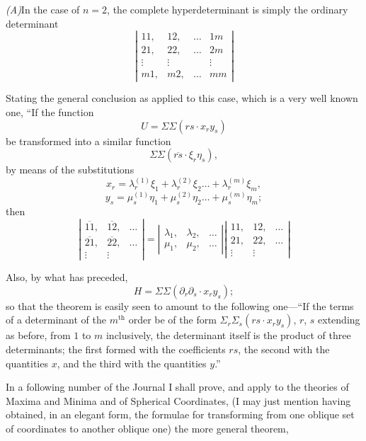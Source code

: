 \documentclass[11pt,a4paper]{book}
\begin{document}
\textit{(A)}\quad In the case of $n=2$, the complete hyperdeterminant is simply the ordinary
determinant
\[
\left|\begin{array}{cccc}
11, & 12, & \ldots & 1m \\
21, & 22, & \ldots & 2m \\
\vdots & \vdots & & \vdots \\
m1, & m2, & \ldots & mm
\end{array}\right|
\]

Stating the general conclusion as applied to this case, which is a very well known one,
``If the function
\[
U = \Sigma\Sigma(rs \cdot x_r y_s)
\]
be transformed into a similar function
\[
\Sigma\Sigma(\overline{rs} \cdot \xi_r \eta_s),
\]
by means of the substitutions
\[
x_r = \lambda_r^{(1)} \xi_1 + \lambda_r^{(2)} \xi_2 \ldots + \lambda_r^{(m)} \xi_m,
\]
\[
y_s = \mu_s^{(1)} \eta_1 + \mu_s^{(2)} \eta_2 \ldots + \mu_s^{(m)} \eta_m;
\]
then
\[
\left|\begin{array}{cccc}
\overline{11}, & \overline{12}, & \ldots \\
\overline{21}, & \overline{22}, & \ldots \\
\vdots & \vdots
\end{array}\right|
=
\left|\begin{array}{cccc}
\lambda_1, & \lambda_2, & \ldots \\
\mu_1, & \mu_2, & \ldots
\end{array}\right|
\left|\begin{array}{cccc}
11, & 12, & \ldots \\
21, & 22, & \ldots \\
\vdots & \vdots
\end{array}\right|
\]

Also, by what has preceded,
\[
H = \Sigma\Sigma(\partial_r \partial_s \cdot x_r y_s);
\]
so that the theorem is easily seen to amount to the following one---``If the terms of
a determinant of the $m^{\text{th}}$ order be of the form $\Sigma_r \Sigma_s (rs \cdot x_r y_s)$, $r$, $s$ extending as
before, from $1$ to $m$ inclusively, the determinant itself is the product of three determinants;
the first formed with the coefficients $rs$, the second with the quantities $x$,
and the third with the quantities $y$.''

\newpage
In a following number of the Journal I shall prove, and apply to the theories of
Maxima and Minima and of Spherical Coordinates, (I may just mention having obtained,
in an elegant form, the formulae for transforming from one oblique set of coordinates
to another oblique one) the more general theorem,
\end{document}
